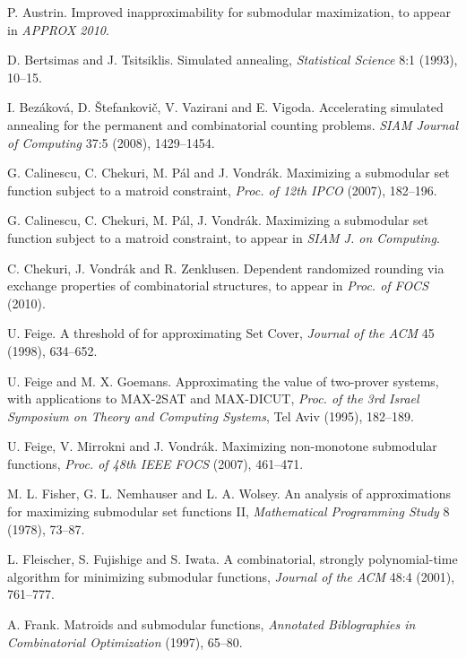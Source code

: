 \documentclass{article}[11pt]
\begin{document}
\begin{thebibliography}{99}

 P. Austrin.
Improved inapproximability for submodular maximization,
to appear in {\em APPROX 2010}.

 D. Bertsimas and J. Tsitsiklis.
Simulated annealing,
{\em Statistical Science} 8:1 (1993), 10--15.

 I. Bez\'akov\'a, D. \v{S}tefankovi\v{c}, V. Vazirani and E. Vigoda.
Accelerating simulated annealing for the permanent and combinatorial counting problems.
{\em SIAM Journal of Computing} 37:5 (2008), 1429--1454.

 G. Calinescu, C. Chekuri, M. P\'al and J. Vondr\'ak.
Maximizing a submodular set function subject to a matroid constraint,
{\em Proc. of 12th IPCO} (2007), 182--196.

 G. Calinescu, C. Chekuri, M. P\'al, J. Vondr\'ak.
Maximizing a submodular set function subject to a matroid constraint,
to appear in \emph{SIAM J. on Computing}.

 C. Chekuri, J. Vondr\'ak and R. Zenklusen.
Dependent randomized rounding via exchange properties of combinatorial structures,
to appear in {\em Proc. of  FOCS} (2010).

 U. Feige.
A threshold of  for approximating Set Cover,
{\em Journal of the ACM} 45 (1998), 634--652.

 U. Feige and M. X. Goemans.
Approximating the value of two-prover systems, with applications to MAX-2SAT and MAX-DICUT,
{\em Proc. of the 3rd Israel Symposium on Theory and Computing Systems}, Tel Aviv (1995), 182--189.

 U. Feige, V. Mirrokni and J. Vondr\'ak.
Maximizing non-monotone submodular functions,
\emph{Proc. of 48th IEEE FOCS} (2007), 461--471.

 M. L. Fisher, G. L. Nemhauser and L. A. Wolsey.
An analysis of approximations for maximizing submodular set functions II,
{\em Mathematical Programming Study} 8 (1978), 73--87.

  L. Fleischer, S. Fujishige and S. Iwata.
A combinatorial, strongly polynomial-time algorithm for minimizing submodular functions,
{\em Journal of the ACM} 48:4 (2001), 761--777.

 A. Frank.
Matroids and submodular functions,
{\em Annotated Biblographies in Combinatorial Optimization} (1997), 65--80.


\end{thebibliography}
\end{document}
